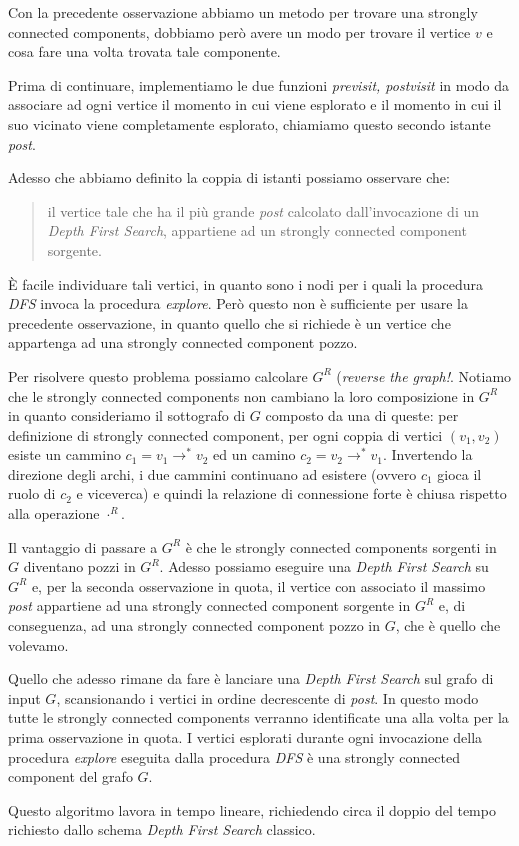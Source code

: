 Con la precedente osservazione abbiamo un metodo per trovare una
strongly connected components, dobbiamo per\`o avere un modo per
trovare il vertice $v$ e cosa fare una volta trovata tale componente.

Prima di continuare, implementiamo le due funzioni \emph{previsit,
  postvisit} in modo da associare ad ogni vertice il momento in cui
viene esplorato e il momento in cui il suo vicinato viene
completamente esplorato, chiamiamo questo secondo istante \emph{post}.

Adesso che abbiamo definito la coppia di istanti possiamo osservare
che: 
\begin{quotation}
  il vertice tale che ha il pi\`u grande \emph{post} calcolato
  dall'invocazione di un \emph{Depth First Search}, appartiene ad un
  strongly connected component sorgente.
\end{quotation}

\`E facile individuare tali vertici, in quanto sono i nodi per i quali
la procedura \emph{DFS} invoca la procedura \emph{explore}. Per\`o
questo non \`e sufficiente per usare la precedente osservazione, in
quanto quello che si richiede \`e un vertice che appartenga ad una
strongly connected component pozzo.

Per risolvere questo problema possiamo calcolare $G^{R}$
(\emph{reverse the graph!}. Notiamo che le strongly connected
components non cambiano la loro composizione in $G^{R}$ in quanto
consideriamo il sottografo di $G$ composto da una di queste: per
definizione di strongly connected component, per ogni coppia di
vertici $(v_{1}, v_{2})$ esiste un cammino $c_{1} =
v_{1}\rightarrow^{*} v_{2}$ ed un camino $c_{2} = v_{2}\rightarrow^{*}
v_{1}$. Invertendo la direzione degli archi, i due cammini continuano
ad esistere (ovvero $c_{1}$ gioca il ruolo di $c_{2}$ e viceverca) e
quindi la relazione di connessione forte \`e chiusa rispetto alla
operazione $\cdot ^{R}$.

Il vantaggio di passare a $G^{R}$ \`e che le strongly connected
components sorgenti in $G$ diventano pozzi in $G^{R}$. Adesso possiamo
eseguire una \emph{Depth First Search} su $G^{R}$ e, per la seconda
osservazione in quota, il vertice con associato il massimo \emph{post}
appartiene ad una strongly connected component sorgente in $G^{R}$ e,
di conseguenza, ad una strongly connected component pozzo in $G$, che
\`e quello che volevamo.

Quello che adesso rimane da fare \`e lanciare una \emph{Depth First
  Search} sul grafo di input $G$, scansionando i vertici in ordine
decrescente di \emph{post}. In questo modo tutte le strongly connected
components verranno identificate una alla volta per la prima
osservazione in quota. I vertici esplorati durante ogni invocazione
della procedura \emph{explore} eseguita dalla procedura \emph{DFS} \`e
una strongly connected component del grafo $G$.

Questo algoritmo lavora in tempo lineare, richiedendo circa il doppio
del tempo richiesto dallo schema \emph{Depth First Search} classico.

